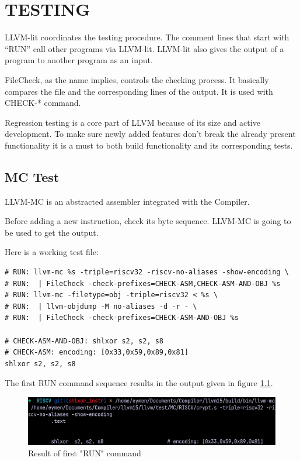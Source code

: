 \clearpage
\chapter{TESTING}\label{Ch10}
LLVM-lit coordinates the testing procedure. The comment lines that start with “RUN” call other programs via LLVM-lit. LLVM-lit also gives the output of a program to another program as an input.

FileCheck, as the name implies, controls the checking process. It basically compares the file and the corresponding lines of the output. It is used with CHECK-* command.

Regression testing is a core part of LLVM because of its size and active development. To make sure newly added features don’t break the already present functionality it is a must to both build functionality and its corresponding tests.

\section{MC Test}
LLVM-MC is an abstracted assembler integrated with the Compiler. \cite{Lattner2010Apr}

Before adding a new instruction, check its byte sequence. LLVM-MC is going to be used to get the output. 

Here is a working test file:

\begin{lstlisting}
# RUN: llvm-mc %s -triple=riscv32 -riscv-no-aliases -show-encoding \ 
# RUN: 	| FileCheck -check-prefixes=CHECK-ASM,CHECK-ASM-AND-OBJ %s 
# RUN: llvm-mc -filetype=obj -triple=riscv32 < %s \ 
# RUN: 	| llvm-objdump -M no-aliases -d -r - \ 
# RUN: 	| FileCheck -check-prefixes=CHECK-ASM-AND-OBJ %s 

# CHECK-ASM-AND-OBJ: shlxor s2, s2, s8 
# CHECK-ASM: encoding: [0x33,0x59,0x89,0x81] 
shlxor s2, s2, s8
\end{lstlisting}


The first RUN command sequence results in the output given in figure \ref{fig:result_of_first_run_command}.
\begin{figure}
    \centering
    \includegraphics{testing/result_of_first_run_command.png}
    \caption{Result of first "RUN" command}
    \label{fig:result_of_first_run_command}
\end{figure}

